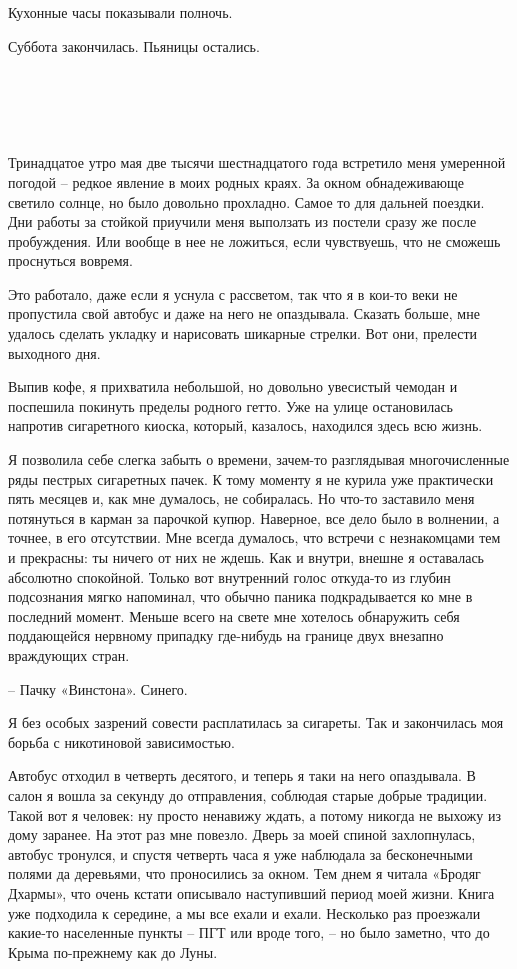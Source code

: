 \documentclass[
]{book}
\begin{document}
Кухонные часы показывали полночь.

Суббота закончилась. Пьяницы остались.

\hypertarget{chapter-4}{%
\chapter{~}\label{chapter-4}}

Тринадцатое утро мая две тысячи шестнадцатого года встретило меня умеренной погодой -- редкое явление в моих родных краях. За окном обнадеживающе светило солнце, но было довольно прохладно. Самое то для дальней поездки. Дни работы за стойкой приучили меня выползать из постели сразу же после пробуждения. Или вообще в нее не ложиться, если чувствуешь, что не сможешь проснуться вовремя.

Это работало, даже если я уснула с рассветом, так что я в кои-то веки не пропустила свой автобус и даже на него не опаздывала. Сказать больше, мне удалось сделать укладку и нарисовать шикарные стрелки. Вот они, прелести выходного дня.

Выпив кофе, я прихватила небольшой, но довольно увесистый чемодан и поспешила покинуть пределы родного гетто. Уже на улице остановилась напротив сигаретного киоска, который, казалось, находился здесь всю жизнь.

Я позволила себе слегка забыть о времени, зачем-то разглядывая многочисленные ряды пестрых сигаретных пачек. К тому моменту я не курила уже практически пять месяцев и, как мне думалось, не собиралась. Но что-то заставило меня потянуться в карман за парочкой купюр. Наверное, все дело было в волнении, а точнее, в его отсутствии. Мне всегда думалось, что встречи с незнакомцами тем и прекрасны: ты ничего от них не ждешь. Как и внутри, внешне я оставалась абсолютно спокойной. Только вот внутренний голос откуда-то из глубин подсознания мягко напоминал, что обычно паника подкрадывается ко мне в последний момент. Меньше всего на свете мне хотелось обнаружить себя поддающейся нервному припадку где-нибудь на границе двух внезапно враждующих стран.

-- Пачку «Винстона». Синего.

Я без особых зазрений совести расплатилась за сигареты. Так и закончилась моя борьба с никотиновой зависимостью.

Автобус отходил в четверть десятого, и теперь я таки на него опаздывала. В салон я вошла за секунду до отправления, соблюдая старые добрые традиции. Такой вот я человек: ну просто ненавижу ждать, а потому никогда не выхожу из дому заранее. На этот раз мне повезло. Дверь за моей спиной захлопнулась, автобус тронулся, и спустя четверть часа я уже наблюдала за бесконечными полями да деревьями, что проносились за окном. Тем днем я читала «Бродяг Дхармы», что очень кстати описывало наступивший период моей жизни. Книга уже подходила к середине, а мы все ехали и ехали. Несколько раз проезжали какие-то населенные пункты -- ПГТ или вроде того, -- но было заметно, что до Крыма по-прежнему как до Луны.
\end{document}
